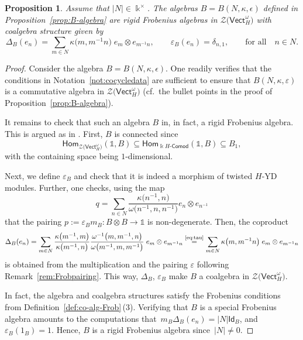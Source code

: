 \documentclass[10pt,a4paper]{amsart}
\numberwithin{equation}{section}
\newtheorem{Proposition}[Theorem]{Proposition}
 { \theoremstyle{definition}
\newtheorem{Definition}[Theorem]{Definition}
\newtheorem{Note}[Theorem]{Note}
\newtheorem{Notation}[Theorem]{Notation}
\newtheorem{Example}[Theorem]{Example}
\newtheorem{Remark}[Theorem]{Remark} }
\newcommand{\lcomod}[1]{#1\text{-}\mathsf{Comod}}
\newcommand{\Hom}{\mathsf{Hom}}
\newcommand{\ide}{\mathsf{Id}}
\newcommand{\one}{\mathds{1}}
\newcommand{\Vect}{\mathsf{Vect}}
\newcommand{\cZ}{\mathcal{Z}}
\begin{document}
\begin{Proposition}\label{prop:Brigid}
Assume that $|N| \in \Bbbk^\times$.
The algebras $B=B(N,\kappa, \epsilon)$ defined in Proposition~{\rm \ref{prop:B-algebra}} are rigid Frobenius algebras in $\cZ\big(\Vect_{H}^\omega\big)$ with coalgebra structure given by
 \[\Delta_B(e_n) = \sum_{m\in N}\kappa\big(m,m^{-1}n\big) \;e_{m}\otimes e_{m^{-1}n}, \qquad \varepsilon_B(e_n) = \delta_{n,1}, \qquad \text{for all}\quad n\in N.\]
\end{Proposition}
\begin{proof}

Consider the algebra $B=B(N,\kappa, \epsilon)$. One readily verifies that the conditions in Notation~\ref{not:cocycledata} are sufficient to ensure that $B(N,\kappa,\varepsilon)$ is a commutative algebra in $\cZ\big(\Vect_H^\omega\big)$ (cf.\ the bullet points in the proof of Proposition~\ref{prop:B-algebra}).

It remains to check that such an algebra $B$ in, in fact, a rigid Frobenius algebra. This is argued as in \cite[Proposition~6.12\,(2)]{LW3}. First, $B$ is connected since \[\Hom_{\cZ\big(\Vect_H^\omega\big)}(\one,B)\subseteq \Hom_{\lcomod{\Bbbk H}}(\one,B)\subseteq B_1,\]
with the containing space being $1$-dimensional.



Next, we define $\varepsilon_B$ and check that it is indeed a morphism of twisted $H$-YD modules. Further, one checks, using the map
\[q=\sum_{n\in N}\frac{\kappa\big(n^{-1},n\big)}{\omega\big(n^{-1},n,n^{-1}\big)}e_n\otimes e_{n^{-1}}\]
that the pairing $p:= \varepsilon_B m_B\colon B\otimes B\to \one$ is non-degenerate.
Then, the coproduct
\[\Delta_B(e_n) = \sum_{m\in N}\frac{\kappa\big(m^{-1},m\big)}{\kappa\big(m^{-1},n\big)}\frac{\omega^{-1}\big(m,m^{-1},n\big)}{\omega\big(m^{-1},m,m^{-1}\big)}\;e_{m}\otimes e_{m^{-1}n} \stackrel{\text{\eqref{eq:tau}}}{=}\sum_{m\in N}\kappa\big(m,m^{-1}n\big) \;e_{m}\otimes e_{m^{-1}n}\]
is obtained from the multiplication and the pairing
$\varepsilon$ following Remark~\ref{rem:Frobpairing}.
This way, $\Delta_B$, $\varepsilon_B$ make $B$ a coalgebra in $\cZ\big(\Vect_H^\omega\big)$.

In fact, the algebra and coalgebra structures satisfy the Frobenius conditions from Definition~\ref{def:co-alg-Frob}\,(3). Verifying that $B$ is a special Frobenius algebra amounts to the computations that~$m_B \Delta_B (e_n)=|N|\ide_B$, and $\varepsilon_B(1_B)=1$.
Hence, $B$ is a rigid Frobenius algebra since~$|N|\neq 0$.
\end{proof}
\end{document}
